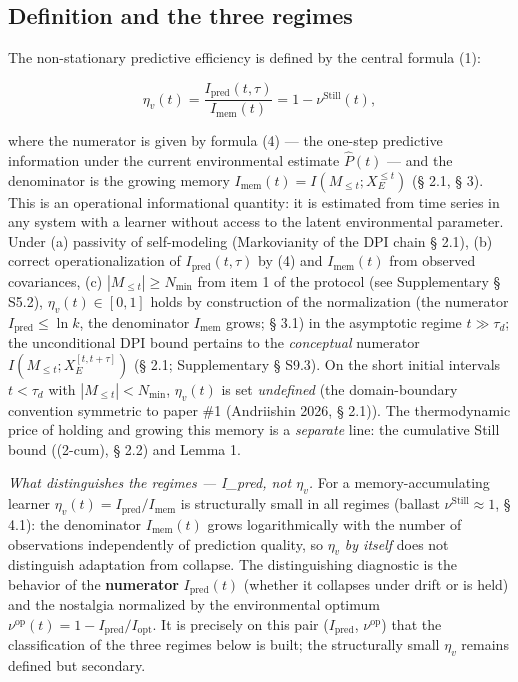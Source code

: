 \documentclass[pdflatex,sn-mathphys-ay]{sn-jnl}
\begin{document}
\subsection{Definition and the three regimes}\label{definition-and-the-three-regimes}



The non-stationary predictive efficiency is defined by the central formula (1):



\begin{equation}\eta_v(t) = \frac{I_{\text{pred}}(t, \tau)}{I_{\text{mem}}(t)} = 1 - \nu^{\text{Still}}(t), \tag{10}\end{equation}



where the numerator is given by formula (4) --- the one-step predictive information under the current environmental estimate \(\hat P(t)\) --- and the denominator is the growing memory \(I_{\text{mem}}(t) = I(M_{\le t}; X_E^{\le t})\) (§ 2.1, § 3). This is an operational informational quantity: it is estimated from time series in any system with a learner without access to the latent environmental parameter. Under (a) passivity of self-modeling (Markovianity of the DPI chain § 2.1), (b) correct operationalization of \(I_{\text{pred}}(t,\tau)\) by (4) and \(I_{\text{mem}}(t)\) from observed covariances, (c) \(|M_{\le t}| \ge N_{\min}\) from item 1 of the protocol (see Supplementary § S5.2), \(\eta_v(t) \in [0, 1]\) holds by construction of the normalization (the numerator \(I_{\text{pred}} \le \ln k\), the denominator \(I_{\text{mem}}\) grows; § 3.1) in the asymptotic regime \(t \gg \tau_d\); the unconditional DPI bound pertains to the \emph{conceptual} numerator \(I(M_{\le t}; X_E^{[t,t+\tau]})\) (§ 2.1; Supplementary § S9.3). On the short initial intervals \(t < \tau_d\) with \(|M_{\le t}| < N_{\min}\), \(\eta_v(t)\) is set \emph{undefined} (the domain-boundary convention symmetric to paper \#1 (Andriishin 2026, § 2.1)). The thermodynamic price of holding and growing this memory is a \emph{separate} line: the cumulative Still bound ((2-cum), § 2.2) and Lemma 1.



\emph{What distinguishes the regimes --- I\_pred, not \(\eta_v\).} For a memory-accumulating learner \(\eta_v(t) = I_{\text{pred}}/I_{\text{mem}}\) is structurally small in all regimes (ballast \(\nu^{\text{Still}} \approx 1\), § 4.1): the denominator \(I_{\text{mem}}(t)\) grows logarithmically with the number of observations independently of prediction quality, so \(\eta_v\) \emph{by itself} does not distinguish adaptation from collapse. The distinguishing diagnostic is the behavior of the \textbf{numerator} \(I_{\text{pred}}(t)\) (whether it collapses under drift or is held) and the nostalgia normalized by the environmental optimum \(\nu^{\text{op}}(t) = 1 - I_{\text{pred}}/I_{\text{opt}}\). It is precisely on this pair (\(I_{\text{pred}}\), \(\nu^{\text{op}}\)) that the classification of the three regimes below is built; the structurally small \(\eta_v\) remains defined but secondary.
\end{document}
